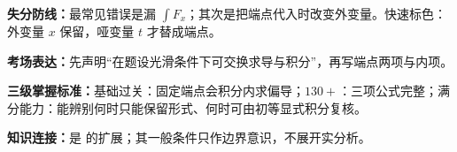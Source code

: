 \begin{knowledgeBox}
\textbf{失分防线：}最常见错误是漏 \(\int F_x\)；其次是把端点代入时改变外变量。快速标色：外变量 \(x\) 保留，哑变量 \(t\) 才替成端点。

\textbf{考场表达：}先声明“在题设光滑条件下可交换求导与积分”，再写端点两项与内项。

\textbf{三级掌握标准：}基础过关：固定端点会积分内求偏导；\(130+\)：三项公式完整；满分能力：能辨别何时只能保留形式、何时可由初等显式积分复核。

\textbf{知识连接：}是 的扩展；其一般条件只作边界意识，不展开实分析。
\end{knowledgeBox}


\par

